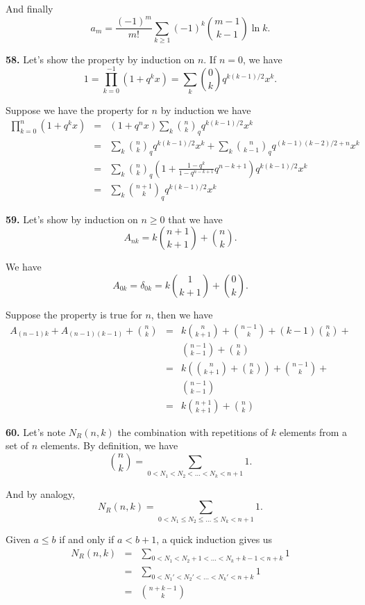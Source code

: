 \documentclass[a4paper,12pt]{article}
\newcommand{\newpar}[1]{\bigskip \noindent \textbf{#1.}}
\begin{document}
And finally
\[ a_m = \frac{(-1)^m}{m!} \sum_{k\ge 1} (-1)^k {m-1 \choose k-1}\ln
k.\]

\newpar{58} Let's show the property by induction on $n$.  If $n=0$, we
have
\[  1 = \prod_{k=0}^{-1} (1+q^k x) = \sum_k {0 \choose k} q^{k(k-1)/2}
x^k.\]

Suppose we have the property for $n$ by induction we have
\begin{eqnarray*}
  \prod_{k=0}^n(1+q^k x) &=& (1+q^n x) \sum_k {n \choose k}_q
  q^{k(k-1)/2}x^k \\
  &=& \sum_k {n \choose k}_q q^{k(k-1)/2}x^k + \sum_k {n \choose k-1}_q
  q^{(k-1)(k-2)/2 + n} x^k \\
  &=& \sum_k {n \choose k}_q \left(1 + \frac{1-q^k}{1-q^{n-k+1}}
  q^{n-k+1}\right) q^{k(k-1)/2}x^k \\
  &=& \sum_k {n+1 \choose k}_q q^{k(k-1)/2} x^k
\end{eqnarray*}

\newpar{59} Let's show by induction on $n \ge 0$ that we have
\[ A_{nk} = k {n+1 \choose k+1} + {n \choose k}.\]

We have
\[ A_{0k} = \delta_{0k} = k {1 \choose k+1} + {0 \choose k}.\]

Suppose the property is true for $n$, then we have
\begin{eqnarray*}
  A_{(n-1)k} + A_{(n-1)(k-1)} + {n \choose k} &=& k {n \choose k+1} +
  {n-1 \choose k} + (k-1) {n \choose k} + \\ && {n-1 \choose k-1} + {n
    \choose k} \\
  &=& k \left( {n \choose k+1} + {n \choose k} \right) + {n-1 \choose
    k} + \\ && {n-1 \choose k-1} \\
  &=& k {n+1 \choose k+1} + {n \choose k}
\end{eqnarray*}

\newpar{60} Let's note $N_R(n, k)$ the combination with repetitions of
$k$ elements from a set of $n$ elements. By definition, we have
\[ {n \choose k} = \sum_{0 < N_1 < N_2 < \ldots < N_k < n+1} 1.\]

And by analogy,
\[  N_R(n, k) = \sum_{0 < N_1 \le N_2 \le \ldots \le N_k < n+1} 1.\]

Given $a\le b$ if and only if $a < b+1$, a quick induction gives us
\begin{eqnarray*}
  N_R(n, k) &=& \sum_{0 < N_1 < N_2+1 < \ldots < N_k + k-1 < n+k} 1 \\
  &=& \sum_{0 < N_1\prime < N_2\prime < \ldots < N_k\prime < n+k} 1 \\
  &=& {n+k-1 \choose k}
\end{eqnarray*}
\end{document}
